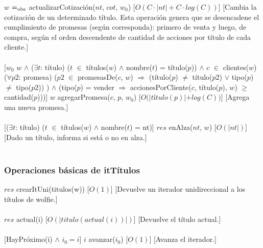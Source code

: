   {$w$ $=_{\mathrm{obs}}$ actualizarCotizaci\'on($nt$, $cot$, $w_{0}$)}%
  [$O(C \cdotp |nt|+C \cdotp log(C))$]
  [Cambia la cotizaci\'on de un determinado t\'itulo. Esta operaci\'on genera que se desencadene el cumplimiento de promesas (seg\'un corresponda): primero de venta y luego, de compra, seg\'un el orden descendente de cantidad de acciones por t\'itulo de cada cliente.]\\\\
  [$w_{0}$ \igobs $w$ $\land$ ($\exists$$t$: t\'itulo) ($t$ $\in$ t\'itulos($w$) $\land$ nombre($t$) = t\'itulo($p$)) $\land$ $c$ $\in$ clientes($w$) \yluego ($\forall$$p2$: promesa) ($p2$ $\in$ promesasDe($c$, $w$) $\Rightarrow$ (t\'itulo($p$) $\neq$ t\'itulo($p2$) $\lor$ tipo($p$) $\neq$ tipo($p2$)) ) $\land$ (tipo($p$) = vender $\Rightarrow$ accionesPorCliente($c$, t\'itulo($p$), $w$) $\geq$ cantidad($p$)))]
  {$w$ \igobs agregarPromesa($c$, $p$, $w_{0}$)}%
  [$O(|t$\'i$tulo(p)| + log(C))$]
  [Agrega una nueva promesa.]\\\\
  [($\exists$$t$: t\'itulo) ($t$ $\in$ t\'itulos($w$) $\land$ nombre($t$) = nt)]
  {$res$ \igobs enAlza($nt$, $w$)}%
  [$O(|nt|)$]
  [Dado un t\'itulo, informa si est\'a o no en alza.]\\\\
  
   \subsubsection{Operaciones b\'asicas de itT\'itulos}
   
  {$res$ \igobs crearItUni(titulos(w))}%
  [$O(1)$]
  [Devuelve un iterador unidireccional a los t\'itulos de wolfie.]\\\\
  
  {$res$ \igobs actual(i)}%
  [$O(|titulo(actual(i))|)$]
  [Devuelve el t\'itulo actual.]\\\\
  
  [HayPr\'oximo(i) $\land$ $i_{0}=i$]
  {$i$ \igobs avanzar($i_{0}$)}%
  [$O(1)$]
  [Avanza el iterador.]\\\\
     
